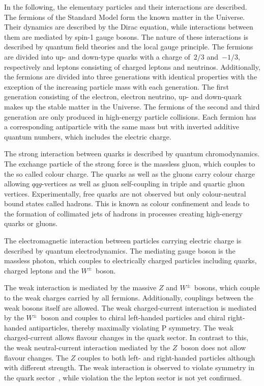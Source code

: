 In the following, the elementary particles and their interactions are described.
The fermions of the Standard Model form the known matter in the Universe. Their
dynamics are described by the Dirac equation, while interactions between them
are mediated by spin-1 gauge bosons. The nature of these interactions is
described by quantum field theories and the local gauge principle. The fermions
are divided into up- and down-type quarks with a charge of~$2/3$ and~$-1/3$,
respectively and leptons consisting of charged leptons and neutrinos.
Additionally, the fermions are divided into three generations with identical
properties with the exception of the increasing particle mass with each
generation. The first generation consisting of the electron, electron neutrino,
up- and down-quark makes up the stable matter in the Universe. The fermions of
the second and third generation are only produced in high-energy particle
collisions. Each fermion has a corresponding antiparticle with the same mass but
with inverted additive quantum numbers, which includes the electric charge.

The strong interaction between quarks is described by quantum chromodynamics.
The exchange particle of the strong force is the massless gluon, which couples
to the so called colour charge. The quarks as well as the gluons carry colour
charge allowing $qqg$-vertices as well as gluon self-coupling in triple and
quartic gluon vertices. Experimentally, free quarks are not observed but only
colour-neutral bound states called hadrons. This is known as colour confinement
and leads to the formation of collimated jets of hadrons in processes creating
high-energy quarks or gluons.

The electromagnetic interaction between particles carrying electric charge is
described by quantum electrodynamics. The mediating gauge boson is the massless
photon, which couples to electrically charged particles including quarks,
charged leptons and the $W^\pm$~boson.

The weak interaction is mediated by the massive $Z$ and $W^\pm$~bosons, which
couple to the weak charges carried by all fermions. Additionally, couplings
between the weak bosons itself are allowed. The weak charged-current interaction
is mediated by the $W^\pm$~boson and couples to chiral left-handed particles and
chiral right-handed antiparticles, thereby maximally violating $\text{P}$
symmetry. The weak charged-current allows flavour changes in the quark sector.
In contrast to this, the weak neutral-current interaction mediated by the
$Z$~boson does not allow flavour changes. The $Z$ couples to both left- and
right-handed particles although with different strength. The weak interaction is
observed to violate \cp symmetry in the quark
sector~\cite{cp_violation_quark_sector, cp_violation_quark_sector_2}, while \cp
violation the the lepton sector is not yet confirmed.

